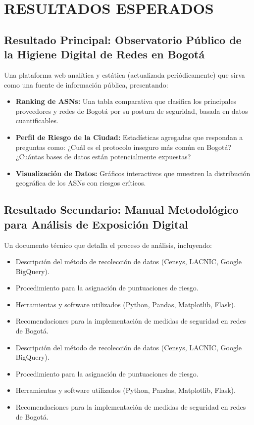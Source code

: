\section{RESULTADOS ESPERADOS}

\subsection{Resultado Principal: Observatorio Público de la Higiene Digital de Redes en Bogotá}

Una plataforma web analítica y estática (actualizada periódicamente) que sirva como una fuente de información pública, presentando:

\begin{itemize}
  \item \textbf{Ranking de ASNs:} Una tabla comparativa que clasifica los principales proveedores y redes de Bogotá por su postura de seguridad, basada en datos cuantificables.
  \item \textbf{Perfil de Riesgo de la Ciudad:} Estadísticas agregadas que respondan a preguntas como: ¿Cuál es el protocolo inseguro más común en Bogotá? ¿Cuántas bases de datos están potencialmente expuestas?
  \item \textbf{Visualización de Datos:} Gráficos interactivos que muestren la distribución geográfica de los ASNs con riesgos críticos.
\end{itemize}

\subsection{Resultado Secundario: Manual Metodológico para Análisis de Exposición Digital}

Un documento técnico que detalla el proceso de análisis, incluyendo:

\begin{itemize}
  \item Descripción del método de recolección de datos (Censys, LACNIC, Google BigQuery).
  \item Procedimiento para la asignación de puntuaciones de riesgo.
  \item Herramientas y software utilizados (Python, Pandas, Matplotlib, Flask).
  \item Recomendaciones para la implementación de medidas de seguridad en redes de Bogotá.
\end{itemize}

\begin{itemize}
  \item Descripción del método de recolección de datos (Censys, LACNIC, Google BigQuery).
  \item Procedimiento para la asignación de puntuaciones de riesgo.
  \item Herramientas y software utilizados (Python, Pandas, Matplotlib, Flask).
  \item Recomendaciones para la implementación de medidas de seguridad en redes de Bogotá.
\end{itemize}

